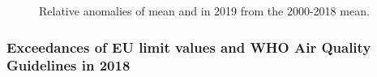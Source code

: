 
\begin{figure}[H]
  \vspace{0.5cm}
\caption{Relative anomalies of mean \PM[10] and \PM[2.5] in 2019 from the 2000-2018 mean.}
\label{fig:PManomin2019}
\end{figure}



\subsubsection[PM exceedances]{Exceedances of EU limit values and WHO Air Quality Guidelines in 2018}
\label{subsec:PMexc}

